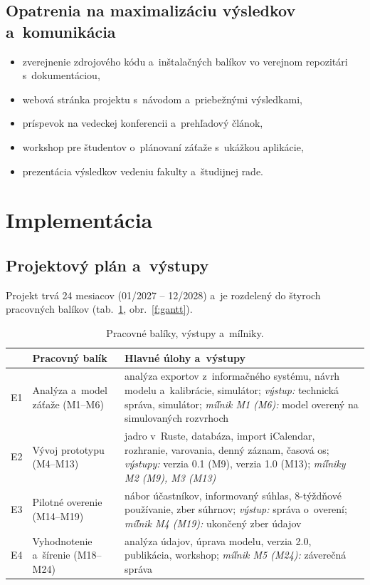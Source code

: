 \documentclass[11pt,a4paper]{article}
\begin{document}
\subsection{Opatrenia na maximalizáciu výsledkov a~komunikácia}

\begin{itemize}[nosep]
  \item zverejnenie zdrojového kódu a~inštalačných balíkov vo verejnom
    repozitári s~dokumentáciou,
  \item webová stránka projektu s~návodom a~priebežnými výsledkami,
  \item príspevok na vedeckej konferencii a~prehľadový článok,
  \item workshop pre študentov o~plánovaní záťaže s~ukážkou aplikácie,
  \item prezentácia výsledkov vedeniu fakulty a~študijnej rade.
\end{itemize}

\section{Implementácia}

\subsection{Projektový plán a~výstupy}

Projekt trvá 24 mesiacov (01/2027 -- 12/2028) a~je rozdelený do štyroch
pracovných balíkov (tab.~\ref{t:balicky}, obr.~\ref{f:gantt}).

\begin{table}[htb]
\centering
\small
\caption{Pracovné balíky, výstupy a~míľniky.}
\label{t:balicky}
\begin{tabularx}{\linewidth}{@{}l>{\raggedright\arraybackslash}p{40mm}X@{}}
\toprule
& \textbf{Pracovný balík} & \textbf{Hlavné úlohy a~výstupy} \\
\midrule
E1 & Analýza a~model záťaže (M1--M6)
   & analýza exportov z~informačného systému, návrh modelu a~kalibrácie,
     simulátor; \emph{výstup:} technická správa, simulátor;
     \emph{míľnik M1 (M6):} model overený na simulovaných rozvrhoch \\
E2 & Vývoj prototypu (M4--M13)
   & jadro v~Ruste, databáza, import iCalendar, rozhranie, varovania,
     denný záznam, časová os; \emph{výstupy:} verzia 0.1 (M9), verzia 1.0
     (M13); \emph{míľniky M2 (M9), M3 (M13)} \\
E3 & Pilotné overenie (M14--M19)
   & nábor účastníkov, informovaný súhlas, 8-týždňové používanie,
     zber súhrnov; \emph{výstup:} správa o~overení;
     \emph{míľnik M4 (M19):} ukončený zber údajov \\
E4 & Vyhodnotenie a~šírenie (M18--M24)
   & analýza údajov, úprava modelu, verzia 2.0, publikácia, workshop;
     \emph{míľnik M5 (M24):} záverečná správa \\
\bottomrule
\end{tabularx}
\end{table}
\end{document}
